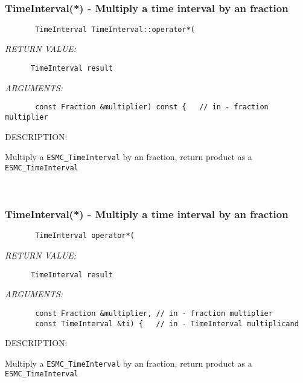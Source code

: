 \mbox{}\hrulefill\ 
 
\subsubsection [TimeInterval(*)] {TimeInterval(*) - Multiply a time interval by an fraction}


  
\begin{verbatim}       TimeInterval TimeInterval::operator*(\end{verbatim}{\em RETURN VALUE:}
\begin{verbatim}      TimeInterval result\end{verbatim}{\em ARGUMENTS:}
\begin{verbatim}       const Fraction &multiplier) const {   // in - fraction multiplier\end{verbatim}
{\sf DESCRIPTION:\\ }


       Multiply a {\tt ESMC\_TimeInterval} by an fraction, return product as a
      {\tt ESMC\_TimeInterval}
   
 
\mbox{}\hrulefill\ 
 
\subsubsection [TimeInterval(*)] {TimeInterval(*) - Multiply a time interval by an fraction}


  
\begin{verbatim}       TimeInterval operator*(\end{verbatim}{\em RETURN VALUE:}
\begin{verbatim}      TimeInterval result\end{verbatim}{\em ARGUMENTS:}
\begin{verbatim}       const Fraction &multiplier, // in - fraction multiplier
       const TimeInterval &ti) {   // in - TimeInterval multiplicand\end{verbatim}
{\sf DESCRIPTION:\\ }


       Multiply a {\tt ESMC\_TimeInterval} by an fraction, return product as a
      {\tt ESMC\_TimeInterval}
   
 
